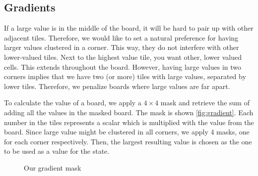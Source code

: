 \documentclass[journal]{IEEEtran}
\begin{document}
\subsection*{Gradients}
If a large value is in the middle of the board, it will be hard to pair up
with other adjacent tiles. Therefore, we would like to set a natural preference
for having larger values clustered in a corner. This way, they do not interfere
with other lower-valued tiles. Next to the highest value tile, you want other,
lower valued cells. This extends throughout the board. However, having large values
in two corners implies that we have two (or more) tiles with large values, separated
by lower tiles. Therefore, we penalize boards where large values are far apart.

To calculate the value of a board, we apply a $4\times{}4$ mask and retrieve the
sum of adding all the values in the masked board.
The mask is shown \autoref{fig:gradient}. Each number in the tiles represents a scalar
which is multiplied with the value from the board. Since large value might be clustered
in all corners, we apply 4 masks, one for each corner respectively. Then,
the largest resulting value is chosen as the one to be used as a value for the state.

\begin{figure}[Hb]
\centering
    \caption{Our gradient mask}
\label{fig:gradient}
\end{figure}
\end{document}
